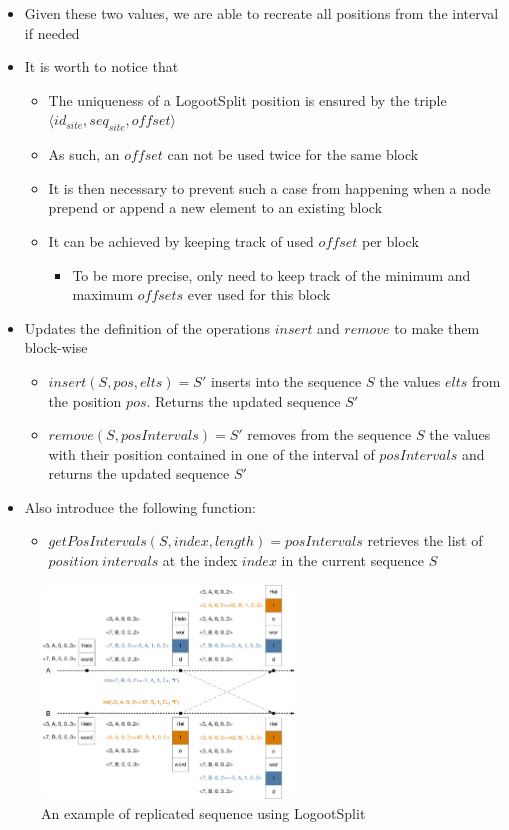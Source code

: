 \documentclass{article}
\newcommand{\tuple}[1]{\langle #1 \rangle}
\newcounter{definition-counter}
\theoremstyle{definition}
\begin{document}
\begin{itemize}
    \item Given these two values, we are able to recreate all positions from the interval if needed
    \item It is worth to notice that
    \begin{itemize}
        \item The uniqueness of a LogootSplit position is ensured by the triple $\tuple{id_{site}, seq_{site}, offset}$
        \item As such, an $offset$ can not be used twice for the same block
        \item It is then necessary to prevent such a case from happening when a node prepend or append a new element to an existing block
        \item It can be achieved by keeping track of used $offset$ per block
        \begin{itemize}
            \item To be more precise, only need to keep track of the minimum and maximum $offsets$ ever used for this block
        \end{itemize}
    \end{itemize}

    \item Updates the definition of the operations $insert$ and $remove$ to make them block-wise
    \begin{itemize}
        \item $insert(S, pos, elts) = S'$ inserts into the sequence $S$ the values $elts$ from the position $pos$. Returns the updated sequence $S'$
        \item $remove(S, posIntervals) = S'$ removes from the sequence $S$ the values with their position contained in one of the interval of $posIntervals$ and returns the updated sequence $S'$
    \end{itemize}
    \item Also introduce the following function:
    \begin{itemize}
        \item $getPosIntervals(S, index, length) = posIntervals$ retrieves the list of $position \ intervals$  at the index $index$ in the current sequence $S$
    \end{itemize}
\end{itemize}

\begin{figure}
    \centering
        \includegraphics[width=0.6\textwidth]{img/logootsplit-seq.pdf}
    \caption{An example of replicated sequence using LogootSplit}
\end{figure}
\end{document}
